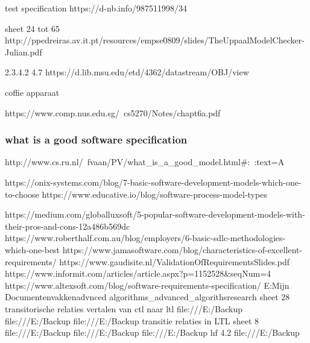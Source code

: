 test specification
https://d-nb.info/987511998/34

sheet 24 tot 65
http://ppedreiras.av.it.pt/resources/empse0809/slides/TheUppaalModelChecker-Julian.pdf


2.3.4.2
4.7
https://d.lib.msu.edu/etd/4362/datastream/OBJ/view

coffie apparaat

https://www.comp.nus.edu.sg/~cs5270/Notes/chapt6a.pdf


\subsubsection{what is a good software specification}

http://www.cs.ru.nl/~fvaan/PV/what_is_a_good_model.html#:~:text=A%

https://onix-systems.com/blog/7-basic-software-development-models-which-one-to-choose
https://www.educative.io/blog/software-process-model-types

https://medium.com/globalluxsoft/5-popular-software-development-models-with-their-pros-and-cons-12a486b569dc
https://www.roberthalf.com.au/blog/employers/6-basic-sdlc-methodologies-which-one-best
https://www.jamasoftware.com/blog/characteristics-of-excellent-requirements/
https://www.gaudisite.nl/ValidationOfRequirementsSlides.pdf
https://www.informit.com/articles/article.aspx?p=1152528&seqNum=4
https://www.altexsoft.com/blog/software-requirements-specification/
E:\Backup Mijn Documenten\Hogeschool vakken\TINLab advnced algorithms\tinlab_advanced_algoriths\achtergrondinfo research
sheet 28 transitorische relaties vertalen van ctl naar ltl
file:///E:/Backup%
file:///E:/Backup%
file:///E:/Backup%
transitie relaties in LTL sheet 8
file:///E:/Backup%
file:///E:/Backup%
file:///E:/Backup%
hf 4.2
file:///E:/Backup%



